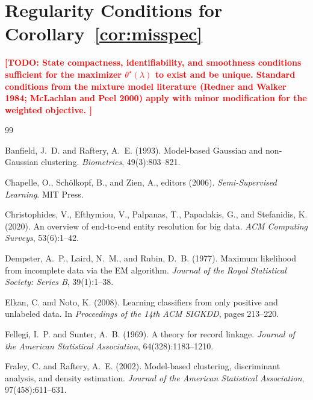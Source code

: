 \documentclass[11pt]{article}
\theoremstyle{definition}
\newcommand{\lam}{\lambda}
\newcommand{\todo}[1]{\textcolor{red}{\textbf{[TODO: #1]}}}
\begin{document}
\section{Regularity Conditions for Corollary~\ref{cor:misspec}}
\label{sec:regularity}

\todo{
  State compactness, identifiability, and smoothness conditions
  sufficient for the maximizer $\theta^\star(\lam)$ to exist and be unique.
  Standard conditions from the mixture model literature
  (Redner and Walker 1984; McLachlan and Peel 2000) apply with
  minor modification for the weighted objective.
}



\begin{thebibliography}{99}

Banfield, J.~D. and Raftery, A.~E. (1993).
Model-based Gaussian and non-Gaussian clustering.
\textit{Biometrics}, 49(3):803--821.

Chapelle, O., Sch\"{o}lkopf, B., and Zien, A., editors (2006).
\textit{Semi-Supervised Learning}.
MIT Press.

Christophides, V., Efthymiou, V., Palpanas, T., Papadakis, G., and Stefanidis, K. (2020).
An overview of end-to-end entity resolution for big data.
\textit{ACM Computing Surveys}, 53(6):1--42.

Dempster, A.~P., Laird, N.~M., and Rubin, D.~B. (1977).
Maximum likelihood from incomplete data via the EM algorithm.
\textit{Journal of the Royal Statistical Society: Series B}, 39(1):1--38.

Elkan, C. and Noto, K. (2008).
Learning classifiers from only positive and unlabeled data.
In \textit{Proceedings of the 14th ACM SIGKDD}, pages 213--220.

Fellegi, I.~P. and Sunter, A.~B. (1969).
A theory for record linkage.
\textit{Journal of the American Statistical Association}, 64(328):1183--1210.

Fraley, C. and Raftery, A.~E. (2002).
Model-based clustering, discriminant analysis, and density estimation.
\textit{Journal of the American Statistical Association}, 97(458):611--631.


\end{thebibliography}
\end{document}

